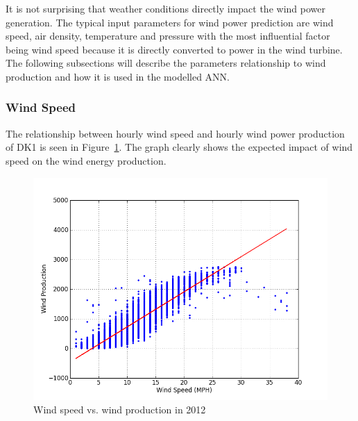It is not surprising that weather conditions directly impact the wind power generation. The typical input parameters for wind power prediction are wind speed, air density, temperature and pressure \cite{WindPowerGenerationUsingANN} with the most influential factor being wind speed because it is directly converted to power in the wind turbine. The following subsections will describe the parameters relationship to wind production and how it is used in the modelled ANN.

\subsubsection{Wind Speed}
The relationship between hourly wind speed and hourly wind power production of DK1 is seen in Figure~\ref{fig:windVsProd}. The graph clearly shows the expected impact of wind speed on the wind energy production.

\begin{figure}[h!]
\centering
\includegraphics[width=0.99\linewidth,natwidth=898,natheight=587]{billeder/WindSpeedVsProduction.png}
\caption{Wind speed vs. wind production in 2012}
\label{fig:windVsProd}
\end{figure}

